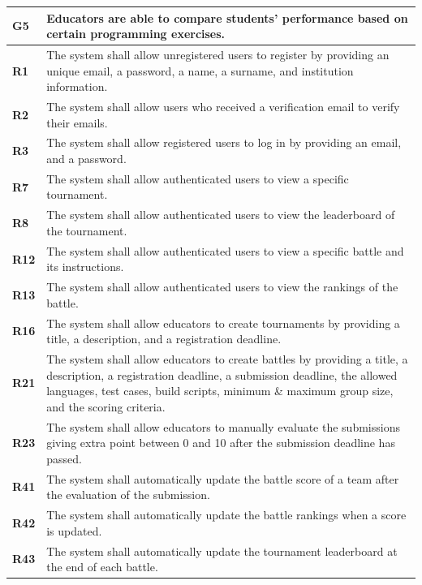 \begin{table}[h!]
  \centering
  \begin{tabular}{lp{15cm}}
    \hline
    \textbf{G5} & Educators are able to compare students’ performance based on certain programming exercises. \\
    \hline
    \hline
    \textbf{R1} & The system shall allow unregistered users to register by providing an unique email, a password, a name, a surname, and institution information. \\

    \textbf{R2} & The system shall allow users who received a verification email to verify their emails. \\

    \textbf{R3} & The system shall allow registered users to log in by providing an email, and a password. \\

    \textbf{R7} & The system shall allow authenticated users to view a specific tournament. \\

    \textbf{R8} & The system shall allow authenticated users to view the leaderboard of the tournament. \\

\textbf{R12} &  The system shall allow authenticated users to view a specific battle and its instructions.\\
\textbf{R13} &  The system shall allow authenticated users to view the rankings of the battle.\\

\textbf{R16} &  The system shall allow educators to create tournaments by providing a title, a description, and a registration deadline.\\
\textbf{R21} &  The system shall allow educators to create battles by providing a title, a description, a registration deadline, a submission deadline, the allowed languages, test cases, build scripts, minimum \& maximum group size, and the scoring criteria.\\

\textbf{R23} &  The system shall allow educators to manually evaluate the submissions giving extra point between 0 and 10 after the submission deadline has passed.\\

\textbf{R41} & The system shall automatically update the battle score of a team after the evaluation of the submission.\\
\textbf{R42} & The system shall automatically update the battle rankings when a score is updated. \\
\textbf{R43} & The system shall automatically update the tournament leaderboard at the end of each battle.\\


\end{tabular}
\end{table}
